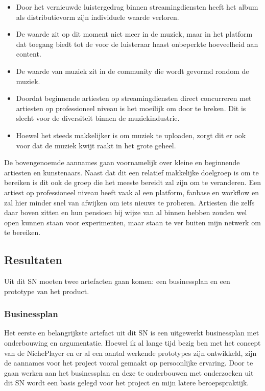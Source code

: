 \begin{itemize}
    \item Door het vernieuwde luistergedrag binnen streamingdiensten heeft het album als distributievorm zijn individuele waarde verloren.
    \item De waarde zit op dit moment niet meer in de muziek, maar in het platform dat toegang biedt tot de voor de luisteraar haast onbeperkte hoeveelheid aan content.
    \item De waarde van muziek zit in de community die wordt gevormd rondom de muziek.
    \item Doordat beginnende artiesten op streamingdiensten direct concurreren met artiesten op professioneel niveau is het moeilijk om door te breken. Dit is slecht voor de diversiteit binnen de muziekindustrie.
    \item Hoewel het steeds makkelijker is om muziek te uploaden, zorgt dit er ook voor dat de muziek kwijt raakt in het grote geheel.
\end{itemize}

De bovengenoemde aannames gaan voornamelijk over kleine en beginnende artiesten en kunstenaars. Naast dat dit een relatief makkelijke doelgroep is om te bereiken is dit ook de groep die het meeste bereidt zal zijn om te veranderen. Een artiest op professioneel niveau heeft vaak al een platform, fanbase en workflow en zal hier minder snel van afwijken om iets nieuws te proberen. Artiesten die zelfs daar boven zitten en hun pensioen bij wijze van al binnen hebben zouden wel open kunnen staan voor experimenten, maar staan te ver buiten mijn netwerk om te bereiken.

\subsection{Resultaten}
Uit dit SN moeten twee artefacten gaan komen: een businessplan en een prototype van het product.

\subsubsection*{Businessplan}
Het eerste en belangrijkste artefact uit dit SN is een uitgewerkt businessplan met onderbouwing en argumentatie. Hoewel ik al lange tijd bezig ben met het concept van de NichePlayer en er al een aantal werkende prototypes zijn ontwikkeld, zijn de aannames voor het project vooral gemaakt op persoonlijke ervaring. Door te gaan werken aan het businessplan en deze te onderbouwen met onderzoeken uit dit SN wordt een basis gelegd voor het project en mijn latere beroepspraktijk.

